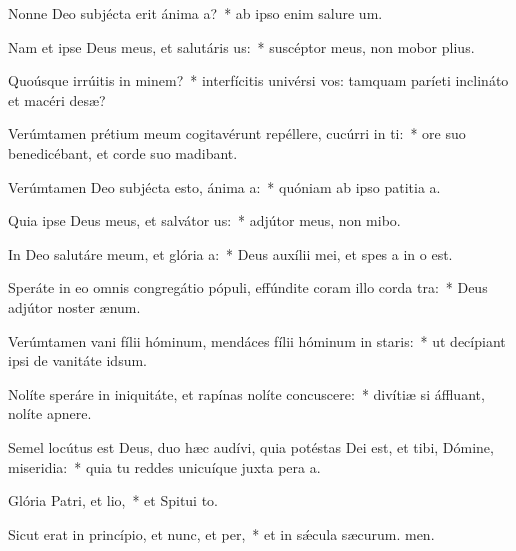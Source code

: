 \item Nonne Deo subjécta erit ánima a?~* ab ipso enim salure um.
\item Nam et ipse Deus meus, et salutáris us:~* suscéptor meus, non mobor plius.
\item Quoúsque irrúitis in minem?~* interfícitis univérsi vos: tamquam paríeti inclináto et macéri desæ?
\item Verúmtamen prétium meum cogitavérunt repéllere, cucúrri in ti:~* ore suo benedicébant, et corde suo madibant.
\item Verúmtamen Deo subjécta esto, ánima a:~* quóniam ab ipso patitia a.
\item Quia ipse Deus meus, et salvátor us:~* adjútor meus, non mibo.
\item In Deo salutáre meum, et glória a:~* Deus auxílii mei, et spes a in o est.
\item Speráte in eo omnis congregátio pópuli, effúndite coram illo corda tra:~* Deus adjútor noster  ænum.
\item Verúmtamen vani fílii hóminum, mendáces fílii hóminum in staris:~* ut decípiant ipsi de vanitáte  idsum.
\item Nolíte speráre in iniquitáte, et rapínas nolíte concuscere:~* divítiæ si áffluant, nolíte  apnere.
\item Semel locútus est Deus, duo hæc audívi, quia potéstas Dei est, et tibi, Dómine, miseridia:~* quia tu reddes unicuíque juxta pera a.
\item Glória Patri, et lio,~* et Spitui to.
\item Sicut erat in princípio, et nunc, et per,~* et in sǽcula sæcurum. men.
